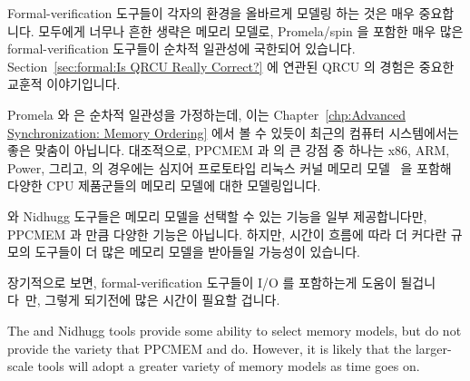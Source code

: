 Formal-verification 도구들이 각자의 환경을 올바르게 모델링 하는 것은 매우
중요합니다.
모두에게 너무나 흔한 생략은 메모리 모델로, Promela/spin 을 포함한 매우 많은
formal-verification 도구들이 순차적 일관성에 국한되어 있습니다.
Section~\ref{sec:formal:Is QRCU Really Correct?}
에 연관된 QRCU 의 경험은 중요한 교훈적 이야기입니다.

Promela 와  은 순차적 일관성을 가정하는데, 이는
Chapter~\ref{chp:Advanced Synchronization: Memory Ordering} 에서 볼 수 있듯이
최근의 컴퓨터 시스템에서는 좋은 맞춤이 아닙니다.
대조적으로, PPCMEM 과  의 큰 강점 중 하나는 x86, ARM, Power, 그리고,
 의 경우에는 심지어 프로토타입 리눅스 커널 메모리
모델~\cite{JadeAlglave2017LWN-LKMM-1,JadeAlglave2017LWN-LKMM-2} 을 포함해
다양한 CPU 제품군들의 메모리 모델에 대한 모델링입니다.
\iffalse

It is critically important that formal-verification tools correctly
model their environment.
One all-too-common omission is the memory model, where a great
many formal-verification tools, including Promela/spin, are
restricted to sequential consistency.
The QRCU experience related in
Section~\ref{sec:formal:Is QRCU Really Correct?}
is an important cautionary tale.

Promela and \co{spin} assume sequential consistency, which is not a
good match for modern computer systems, as was seen in
Chapter~\ref{chp:Advanced Synchronization: Memory Ordering}.
In contrast, one of the great strengths of PPCMEM and \co{herd}
is their detailed modeling of various CPU families memory models,
including x86, ARM, Power, and, in the case of \co{herd},
even a Linux-kernel memory model~\cite{Alglave:2018:FSC:3173162.3177156},
which has been been accepted into version v4.17 of
the Linux kernel.
\fi

 와 Nidhugg 도구들은 메모리 모델을 선택할 수 있는 기능을 일부
제공합니다만, PPCMEM 과  만큼 다양한 기능은 아닙니다.
하지만, 시간이 흐름에 따라 더 커다란 규모의 도구들이 더 많은 메모리 모델을
받아들일 가능성이 있습니다.

장기적으로 보면, formal-verification 도구들이 I/O 를 포함하는게 도움이
될겁니다~\cite{PaulEMcKenney2016LinuxKernelMMIO}만, 그렇게 되기전에 많은 시간이
필요할 겁니다.
\iffalse

The  and Nidhugg tools provide some ability to select
memory models, but do not provide the variety that PPCMEM and
 do.
However, it is likely that the larger-scale tools will adopt
a greater variety of memory models as time goes on.

